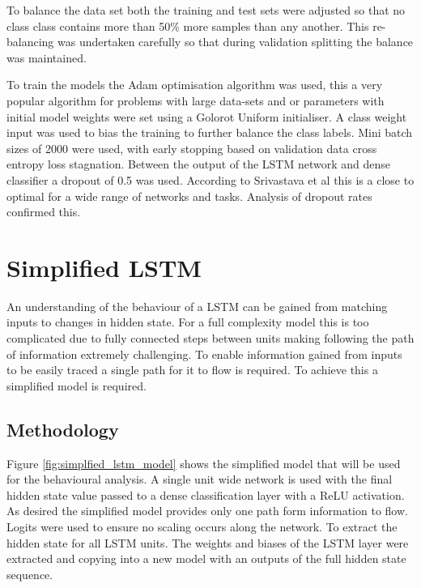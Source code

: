 \documentclass[sensors,article,submit,moreauthors,pdftex]{Definitions/mdpi}
\begin{document}
To balance the data set both the training and test sets were adjusted so that no class class contains more than 50\% more samples than any another. This re-balancing was undertaken carefully so that during validation splitting the balance was maintained.

To train the models the Adam optimisation algorithm was used, this a very popular algorithm for problems with large data-sets and or parameters\cite{Kingma2015} with initial model weights were set using a Golorot Uniform initialiser. A class weight input was used to bias the training to further balance the class labels. Mini batch sizes of 2000 were used, with early stopping based on validation data cross entropy loss stagnation. Between the output of the LSTM network and dense classifier a dropout of 0.5 was used. According to Srivastava et al this is a close to optimal for a wide range of networks and tasks\cite{Srivastava2014}. Analysis of dropout rates confirmed this.




\section{Simplified LSTM}
\label{sec:simplified_model}
An understanding of the behaviour of a LSTM can be gained from matching inputs to changes in hidden state. For a full complexity model this is too complicated due to fully connected steps between units making following the path of information extremely challenging. To enable information gained from inputs to be easily traced a single path for it to flow is required. To achieve this a simplified model is required. 

\subsection{Methodology}
Figure \ref{fig:simplfied_lstm_model} shows the simplified model that will be used for the behavioural analysis. A single unit wide network is used with the final hidden state value passed to a dense classification layer with a ReLU activation. As desired the simplified model provides only one path form information to flow. Logits were used to ensure no scaling occurs along the network. To extract the hidden state for all LSTM units. The weights and biases of the LSTM layer were extracted and copying into a new model with an outputs of the full hidden state sequence.
\end{document}
